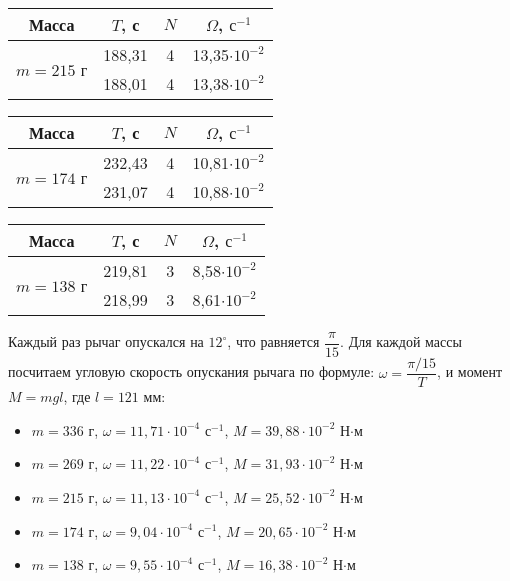 \documentclass[a4paper,12pt]{article}
\begin{document}
	\begin{center}
		\begin{tabular}{|c|c|c|c|}
			\hline
			Масса & $T$, с& $N$ &$\Omega$, $\text{с}^{-1}$ \\
			\hline
			\multirow{2}{*}{$m = 215$ г}&188,31&4& 13,35$\cdot 10^{-2}$ \\
			\cline{2-4}
			&188,01 & 4 &13,38$\cdot 10^{-2}$  \\
			\hline
		\end{tabular}
		\quad
		\begin{tabular}{|c|c|c|c|}
			\hline
			Масса & $T$, с& $N$ &$\Omega$, $\text{с}^{-1}$ \\
			\hline
			\multirow{2}{*}{$m = 174$ г}&232,43&4&10,81$\cdot 10^{-2}$ \\
			\cline{2-4}
			&231,07 & 4 &10,88$\cdot 10^{-2}$  \\
			\hline
		\end{tabular}
	\end{center}

	\begin{center}
		\begin{tabular}{|c|c|c|c|}
			\hline
			Масса & $T$, с& $N$ &$\Omega$, $\text{с}^{-1}$ \\
			\hline
			\multirow{2}{*}{$m = 138$ г}&219,81&3&8,58$\cdot 10^{-2}$ \\
			\cline{2-4}
			&218,99 & 3 &8,61$\cdot 10^{-2}$  \\
			\hline
		\end{tabular}
	\end{center}

	Каждый раз рычаг опускался на $12^\circ$, что равняется $\dfrac{\pi}{15}$. Для каждой массы посчитаем угловую скорость опускания рычага по формуле: $\omega = \dfrac{\pi/15}{T}$, и момент $M = mgl$, где $l = 121$ мм:
	\begin{itemize}
		\item $m = 336$ г, $\omega = 11,71\cdot 10^{-4}$ $\text{с}^{-1}$, $M = 39,88\cdot10^{-2}$ Н$\cdot$м
		\item $m = 269$ г, $\omega = 11,22\cdot 10^{-4}$ $\text{с}^{-1}$, $M = 31,93\cdot10^{-2}$ Н$\cdot$м
		\item $m = 215$ г, $\omega = 11,13\cdot 10^{-4}$ $\text{с}^{-1}$, $M = 25,52\cdot10^{-2}$ Н$\cdot$м
		\item $m = 174$ г, $\omega = 9,04\cdot 10^{-4}$ $\text{с}^{-1}$, $M = 20,65\cdot10^{-2}$ Н$\cdot$м
		\item $m = 138$ г, $\omega = 9,55\cdot 10^{-4}$ $\text{с}^{-1}$, $M = 16,38\cdot10^{-2}$ Н$\cdot$м
	\end{itemize}
\end{document}
